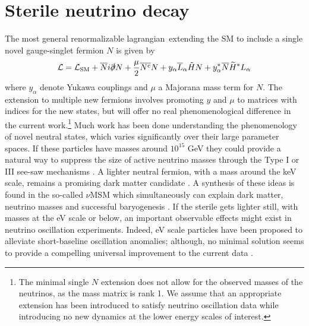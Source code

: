 \documentclass[11pt, a4paper]{article}
\def\lagrangian{lagrangian}
\begin{document}
\section{Sterile neutrino decay}

The most general renormalizable \lagrangian\ extending the SM to include a
single novel gauge-singlet fermion $N$ is given by
%
\begin{align}   \mathcal{L} = \mathcal{L}_\text{SM} +
\overline{N}i\slashed{\partial}N+ \frac{\mu}{2} \overline{N^\text{c}}N  +
y_\alpha\overline{L}_\alpha\tilde{H} N + y_\alpha^*
\overline{N}\widetilde{H}^*L_\alpha\label{eq:minimallag} \end{align}
%
where $y_\alpha$ denote Yukawa couplings and $\mu$ a Majorana mass term for
$N$. The extension to multiple new fermions involves promoting $y$ and $\mu$ to
matrices with indices for the new states, but will offer no real
phenomenological difference in the current work.\footnote{The minimal single
$N$ extension does not allow for the observed masses of the neutrinos, as the
mass matrix is rank 1. We assume that an appropriate extension has been
introduced to satisfy neutrino oscillation data while introducing no new
dynamics at the lower energy scales of interest.} Much work has been done
understanding the phenomenology of novel neutral states, which varies
significantly over their large parameter spaces. 
%
If these particles have masses around $10^{15}$ GeV they could provide a
natural way to suppress the size of active neutrino masses through the Type I
or III see-saw mechanisms \cite{Minkowski:1977sc, GellMann:1980vs,
Mohapatra:1979ia}. A lighter neutral fermion, with a mass around the keV scale,
remains a promising dark matter candidate \cite{Adhikari:2016bei}. A synthesis
of these ideas is found in the so-called $\nu$MSM which simultaneously can
explain dark matter, neutrino masses and successful baryogenesis
\cite{Asaka:2005pn}. 
%
If the sterile gets lighter still, with masses at the eV scale or below, an
important observable effects might exist in neutrino oscillation experiments.
Indeed, eV scale particles have been proposed to alleviate short-baseline
oscillation anomalies; although, no minimal solution seems to provide a
compelling universal improvement to the current data \cite{Kopp:2013vaa}. 
%
\end{document}
